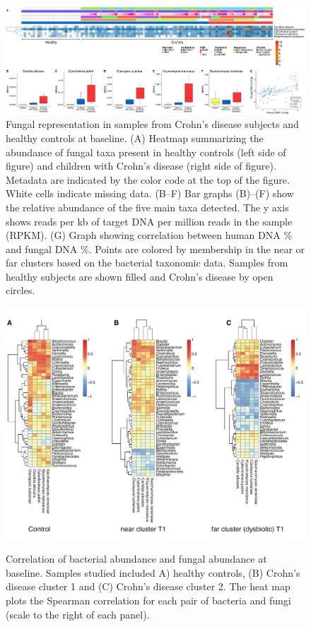 \begin{figure}
\centering
\includegraphics[scale=0.23,trim=0 0 0 0,clip]{Figure/F23_Fugus.pdf}
\caption[Fungal representation in samples from Crohn's disease subjects and healthy controls at baseline]{Fungal representation in samples from Crohn's disease subjects and healthy controls at baseline.
(A) Heatmap summarizing the abundance of fungal taxa present in healthy controls (left side of figure) and children with Crohn's disease (right side of figure). Metadata are indicated by the color code at the top of the figure. White cells indicate missing data.
(B–F) Bar graphs (B)–(F) show the relative abundance of the five main taxa detected. The y axis shows reads per kb of target DNA per million reads in the sample (RPKM).
(G) Graph showing correlation between human DNA \% and fungal DNA \%. Points are colored by membership in the near or far clusters based on the bacterial taxonomic data. Samples from healthy subjects are shown filled and Crohn's disease by open circles. }
\label{F23_Fugus}
\end{figure}




\begin{figure}[p]
	\centering
	{\includegraphics[scale=0.5,trim=0 0 0 0,clip]{Figure/F2S3_taxa_fungi_correlation.pdf}}
	\caption[Correlation of bacterial abundance and fungal abundance at baseline]{Correlation of bacterial abundance and fungal abundance at baseline. Samples studied included A) healthy controls, (B) Crohn’s disease cluster 1 and (C) Crohn’s disease cluster 2. The heat map plots the Spearman correlation for each pair of bacteria and fungi (scale to the right of each panel).
	}
	\label{F2S3_taxa_fungi_correlation}
\end{figure}



